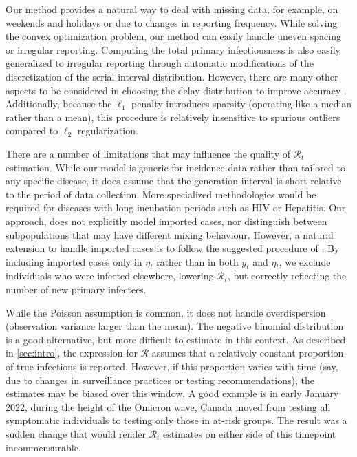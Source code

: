 \documentclass[10pt,letterpaper]{article}
\def\calR{\mathcal{R}}
\begin{document}
Our method provides a natural way to deal with missing data, for example, on
weekends and holidays or due to changes in reporting frequency. While solving
the convex optimization problem, our method can easily handle uneven spacing or
irregular reporting. Computing the total primary infectiousness is also easily
generalized to irregular reporting through automatic modifications of the
discretization of the serial interval distribution. However, there are many
other aspects to be considered in choosing the delay distribution to improve
accuracy \cite{park2024estimating}. Additionally, because the $\ell_1$ penalty
introduces sparsity (operating like a median rather than a mean), this procedure
is relatively insensitive to spurious outliers compared to $\ell_2$
regularization. 


There are a number of limitations that may influence the quality of $\calR_t$
estimation. While our model is generic for incidence data rather than tailored
to any specific disease, it does assume that the generation interval is short
relative to the period of data collection. More specialized methodologies would
be required for diseases with long incubation periods such as HIV or Hepatitis.
Our approach, does not explicitly model imported cases, nor distinguish between
subpopulations that may have different mixing behaviour. However, a natural
extension to handle imported cases is to follow the suggested procedure of
\cite{thompson2019improved}. By including imported cases only in $\eta_t$ rather
than in both $y_t$ and $\eta_t$, we exclude individuals who were infected
elsewhere, lowering $\calR_t$, but correctly reflecting the number of new
primary infectees.

While the Poisson assumption is common, it does not handle overdispersion
(observation variance larger than the mean). The negative binomial distribution
is a good alternative, but more difficult to estimate in this context. As
described in \autoref{sec:intro}, the expression for $\calR$ assumes that a
relatively constant proportion of true infections is reported. However, if this
proportion varies with time (say, due to changes in surveillance practices or
testing recommendations), the estimates may be biased over this window. A good
example is in early January 2022, during the height of the Omicron wave, Canada
moved from testing all symptomatic individuals to testing only those in at-risk
groups. The result was a sudden change that would render $\calR_t$ estimates on
either side of this timepoint incommensurable.
\end{document}

